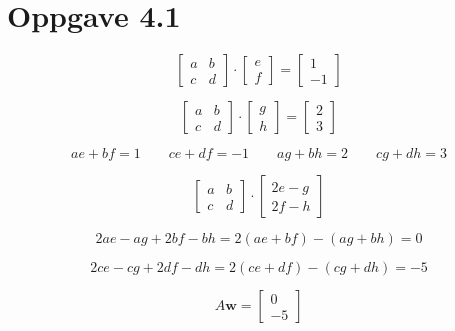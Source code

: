 \section{Oppgave 4.1}

\[
    \left[
    \begin{array}{cc}
        a&b\\
        c&d
    \end{array}    
    \right] \cdot
    \left[
        \begin{array}{c}
            e \\
            f
        \end{array}
    \right] = 
    \left[
        \begin{array}{c}
            1 \\
            -1
        \end{array}    
    \right]
\]

\[
    \left[
    \begin{array}{cc}
        a&b\\
        c&d
    \end{array}    
    \right] \cdot
    \left[
        \begin{array}{c}
            g \\
            h
        \end{array}
    \right] = 
    \left[
        \begin{array}{c}
            2 \\
            3
        \end{array}    
    \right]
\]


\[
    ae + bf = 1\qquad ce + df = -1 \qquad ag + bh = 2 \qquad cg + dh = 3
\]

\[
    \left[
    \begin{array}{cc}
        a&b\\
        c&d
    \end{array}    
    \right] \cdot
    \left[
    \begin{array}{c}
        2e-g\\
        2f-h
    \end{array}    
    \right]      
\]

\[
    2ae - ag + 2bf - bh = 2(ae + bf) - (ag + bh) = 0 
\]

\[
    2ce - cg + 2df - dh = 2(ce + df) - (cg + dh) = -5    
\]

\[
    A\textbf{w} = \left[
        \begin{array}{c}
            0 \\
            -5
        \end{array}    
    \right]
\]